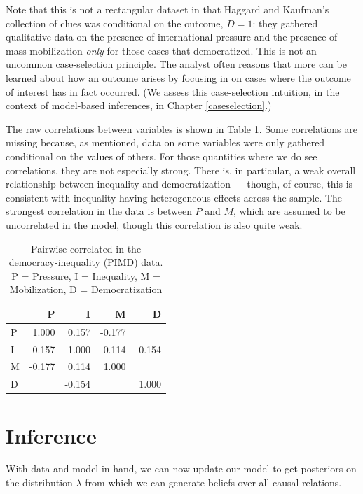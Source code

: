 \documentclass[
  12pt,
]{book}
\begin{document}
Note that this is not a rectangular dataset in that Haggard and Kaufman's collection of clues was conditional on the outcome, \(D=1\): they gathered qualitative data on the presence of international pressure and the presence of mass-mobilization \emph{only} for those cases that democratized. This is not an uncommon case-selection principle. The analyst often reasons that more can be learned about how an outcome arises by focusing in on cases where the outcome of interest has in fact occurred. (We assess this case-selection intuition, in the context of model-based inferences, in Chapter \ref{caseselection}.)

The raw correlations between variables is shown in Table \ref{tab:pimdcorr}. Some correlations are missing because, as mentioned, data on some variables were only gathered conditional on the values of others. For those quantities where we do see correlations, they are not especially strong. There is, in particular, a weak overall relationship between inequality and democratization --- though, of course, this is consistent with inequality having heterogeneous effects across the sample. The strongest correlation in the data is between \(P\) and \(M\), which are assumed to be uncorrelated in the model, though this correlation is also quite weak.

\begin{table}

\caption{\label{tab:pimdcorr}Pairwise correlated in the democracy-inequality (PIMD) data. P = Pressure, I = Inequality, M = Mobilization, D = Democratization}
\centering
\begin{tabular}[t]{l|r|r|r|r}
\hline
  & P & I & M & D\\
\hline
P & 1.000 & 0.157 & -0.177 & \\
\hline
I & 0.157 & 1.000 & 0.114 & -0.154\\
\hline
M & -0.177 & 0.114 & 1.000 & \\
\hline
D &  & -0.154 &  & 1.000\\
\hline
\end{tabular}
\end{table}

\hypertarget{inference-1}{%
\section{Inference}\label{inference-1}}

With data and model in hand, we can now update our model to get posteriors on the distribution \(\lambda\) from which we can generate beliefs over all causal relations.
\end{document}
